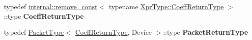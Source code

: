 \begin{DoxyCompactItemize}
typedef \hyperlink{struct_eigen_1_1internal_1_1remove__const}{internal\+::remove\+\_\+const}$<$ typename \hyperlink{group___sparse_core___module}{Xpr\+Type\+::\+Coeff\+Return\+Type} $>$\+::type {\bfseries Coeff\+Return\+Type}
\item 
\mbox{\label{struct_eigen_1_1_tensor_evaluator_3_01const_01_tensor_reduction_op_3_01_op_00_01_dims_00_01_arg_4fdf2ec1445de4704eb590bc98040dc6_acbd480e8ef01e0ae90d3416f2915adc4}} 
typedef \hyperlink{struct_eigen_1_1_packet_type}{Packet\+Type}$<$ \hyperlink{group___sparse_core___module}{Coeff\+Return\+Type}, Device $>$\+::type {\bfseries Packet\+Return\+Type}
\end{DoxyCompactItemize}
